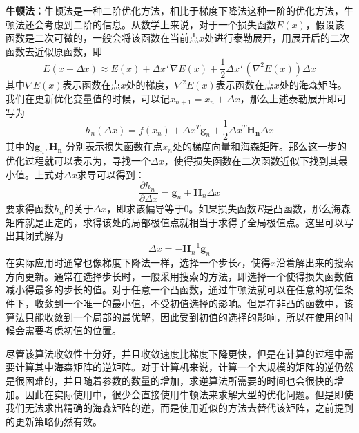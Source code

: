 \textbf{牛顿法：}牛顿法是一种二阶优化方法，相比于梯度下降法这种一阶的优化方法，牛顿法还会考虑到二阶的信息。从数学上来说，对于一个损失函数\(E(x)\)，假设该函数是二次可微的，一般会将该函数在当前点\(x\)处进行泰勒展开，用展开后的二次函数去近似原函数，即
\begin{equation}
    E(x+\Delta x) \approx E(x) + \Delta x^T \nabla E(x) + \frac{1}{2}\Delta x^T (\nabla^2 E(x))\Delta x
\end{equation}
其中\(\nabla E(x)\)表示函数在点\(x\)处的梯度，\(\nabla^2 E(x)\)表示函数在点\(x\)处的海森矩阵。我们在更新优化变量值的时候，可以记\(x_{n+1} = x_n + \Delta x\)，那么上述泰勒展开即可写为
\begin{equation}
    h_n(\Delta x) = f(x_n) + \Delta x^T \mathbf{g}_n + \frac{1}{2}\Delta x^T  \mathbf{H_n}\Delta x
\end{equation}
其中的\(\mathbf{g}_n, \mathbf{H_n}\) 分别表示损失函数在点\(x_n\)处的梯度向量和海森矩阵。那么这一步的优化过程就可以表示为，寻找一个\(\Delta x\)，使得损失函数在二次函数近似下找到其最小值。上式对\(\Delta x\)求导可以得到：
\begin{equation}
    \frac { \partial h _ { n }\ } { \partial \Delta x } = \mathbf { g } _ { n } + \mathbf { H } _ { n } \Delta x
\end{equation}
要求得函数\(h_n\)的关于\(\Delta x\)，即求该偏导等于0。如果损失函数\(E\)是凸函数，那么海森矩阵就是正定的，求得该处的局部极值点就相当于求得了全局极值点。这里可以写出其闭式解为
\begin{equation}\label{eq:newton}
    \Delta x = -  \mathbf { H } _ { n }^{-1} \mathbf { g } _ { n }
\end{equation}
在实际应用时通常也像梯度下降法一样，选择一个步长\(\epsilon\)，使得\(x\)沿着解出来的搜索方向更新。通常在选择步长时，一般采用搜索的方法，即选择一个使得损失函数值减小得最多的步长的值。对于任意一个凸函数，通过牛顿法就可以在任意的初值条件下，收敛到一个唯一的最小值，不受初值选择的影响。但是在非凸的函数中，该算法只能收敛到一个局部的最优解，因此受到初值的选择的影响，所以在使用的时候会需要考虑初值的位置。

尽管该算法收敛性十分好，并且收敛速度比梯度下降更快，但是在计算的过程中需要计算其中海森矩阵的逆矩阵。对于计算机来说，计算一个大规模的矩阵的逆仍然是很困难的，并且随着参数的数量的增加，求逆算法所需要的时间也会很快的增加。因此在实际使用中，很少会直接使用牛顿法来求解大型的优化问题。但是即使我们无法求出精确的海森矩阵的逆，而是使用近似的方法去替代该矩阵，之前提到的更新策略仍然有效。

